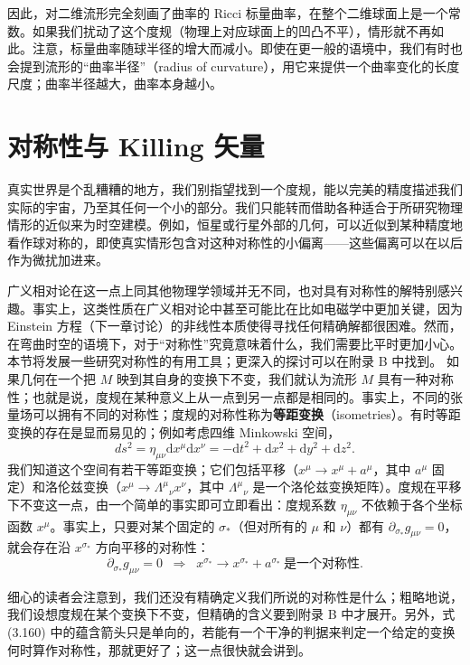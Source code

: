 因此，对二维流形完全刻画了曲率的 Ricci 标量曲率，在整个二维球面上是一个常数。如果我们扰动了这个度规（物理上对应球面上的凹凸不平），情形就不再如此。注意，标量曲率随球半径的增大而减小。即使在更一般的语境中，我们有时也会提到流形的“曲率半径”（radius of curvature），用它来提供一个曲率变化的长度尺度；曲率半径越大，曲率本身越小。

\section{对称性与 Killing 矢量}

真实世界是个乱糟糟的地方，我们别指望找到一个度规，能以完美的精度描述我们实际的宇宙，乃至其任何一个小的部分。我们只能转而借助各种适合于所研究物理情形的近似来为时空建模。例如，恒星或行星外部的几何，可以近似到某种精度地看作球对称的，即使真实情形包含对这种对称性的小偏离——这些偏离可以在以后作为微扰加进来。

广义相对论在这一点上同其他物理学领域并无不同，也对具有对称性的解特别感兴趣。事实上，这类性质在广义相对论中甚至可能比在比如电磁学中更加关键，因为 Einstein 方程（下一章讨论）的非线性本质使得寻找任何精确解都很困难。然而，在弯曲时空的语境下，对于“对称性”究竟意味着什么，我们需要比平时更加小心。本节将发展一些研究对称性的有用工具；更深入的探讨可以在附录 B 中找到。
如果几何在一个把 $M$ 映到其自身的变换下不变，我们就认为流形 $M$ 具有一种对称性；也就是说，度规在某种意义上从一点到另一点都是相同的。事实上，不同的张量场可以拥有不同的对称性；度规的对称性称为\textbf{等距变换}（isometries）。有时等距变换的存在是显而易见的；例如考虑四维 Minkowski 空间，
\begin{equation*}
ds^2 = \eta_{\mu\nu}\mathrm{d}x^\mu\mathrm{d}x^\nu = -\mathrm{d}t^2 + \mathrm{d}x^2 + \mathrm{d}y^2 + \mathrm{d}z^2.
\tag{3.159}
\end{equation*}
我们知道这个空间有若干等距变换；它们包括平移（$x^\mu \to x^\mu + a^\mu$，其中 $a^\mu$ 固定）和洛伦兹变换（$x^\mu \to \Lambda^\mu{}_\nu x^\nu$，其中 $\Lambda^\mu{}_\nu$ 是一个洛伦兹变换矩阵）。度规在平移下不变这一点，由一个简单的事实即可立即看出：度规系数 $\eta_{\mu\nu}$ 不依赖于各个坐标函数 $x^\mu$。事实上，只要对某个固定的 $\sigma_*$（但对所有的 $\mu$ 和 $\nu$）都有 $\partial_{\sigma_*}g_{\mu\nu}=0$，就会存在沿 $x^{\sigma_*}$ 方向平移的对称性：
\begin{equation*}
\partial_{\sigma_*}g_{\mu\nu} = 0 \;\;\Rightarrow\;\; x^{\sigma_*} \to x^{\sigma_*} + a^{\sigma_*}\ \text{是一个对称性.}
\tag{3.160}
\end{equation*}

细心的读者会注意到，我们还没有精确定义我们所说的对称性是什么；粗略地说，我们设想度规在某个变换下不变，但精确的含义要到附录 B 中才展开。另外，式 (3.160) 中的蕴含箭头只是单向的，若能有一个干净的判据来判定一个给定的变换何时算作对称性，那就更好了；这一点很快就会讲到。

